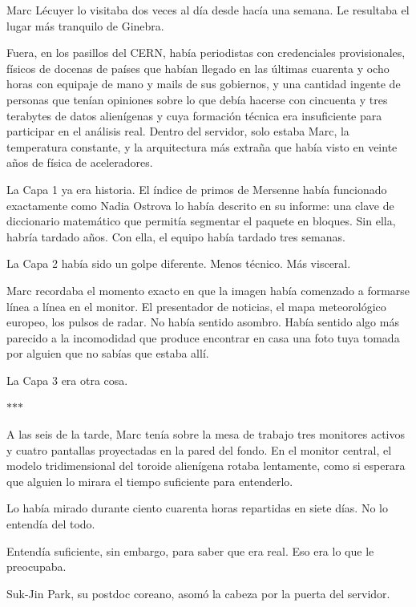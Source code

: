 \documentclass[11pt,a5paper,twoside]{book}
\begin{document}
Marc Lécuyer lo visitaba dos veces al día desde hacía una semana. Le resultaba el lugar más tranquilo de Ginebra.

Fuera, en los pasillos del CERN, había periodistas con credenciales provisionales, físicos de docenas de países que habían llegado en las últimas cuarenta y ocho horas con equipaje de mano y mails de sus gobiernos, y una cantidad ingente de personas que tenían opiniones sobre lo que debía hacerse con cincuenta y tres terabytes de datos alienígenas y cuya formación técnica era insuficiente para participar en el análisis real. Dentro del servidor, solo estaba Marc, la temperatura constante, y la arquitectura más extraña que había visto en veinte años de física de aceleradores.

La Capa 1 ya era historia. El índice de primos de Mersenne había funcionado exactamente como Nadia Ostrova lo había descrito en su informe: una clave de diccionario matemático que permitía segmentar el paquete en bloques. Sin ella, habría tardado años. Con ella, el equipo había tardado tres semanas.

La Capa 2 había sido un golpe diferente. Menos técnico. Más visceral.

Marc recordaba el momento exacto en que la imagen había comenzado a formarse línea a línea en el monitor. El presentador de noticias, el mapa meteorológico europeo, los pulsos de radar. No había sentido asombro. Había sentido algo más parecido a la incomodidad que produce encontrar en casa una foto tuya tomada por alguien que no sabías que estaba allí.

La Capa 3 era otra cosa.

\vspace{1.5em}
\begin{center}$\ast$\quad$\ast$\quad$\ast$\end{center}
\vspace{1.5em}

A las seis de la tarde, Marc tenía sobre la mesa de trabajo tres monitores activos y cuatro pantallas proyectadas en la pared del fondo. En el monitor central, el modelo tridimensional del toroide alienígena rotaba lentamente, como si esperara que alguien lo mirara el tiempo suficiente para entenderlo.

Lo había mirado durante ciento cuarenta horas repartidas en siete días. No lo entendía del todo.

Entendía suficiente, sin embargo, para saber que era real. Eso era lo que le preocupaba.

Suk-Jin Park, su postdoc coreano, asomó la cabeza por la puerta del servidor.
\end{document}
